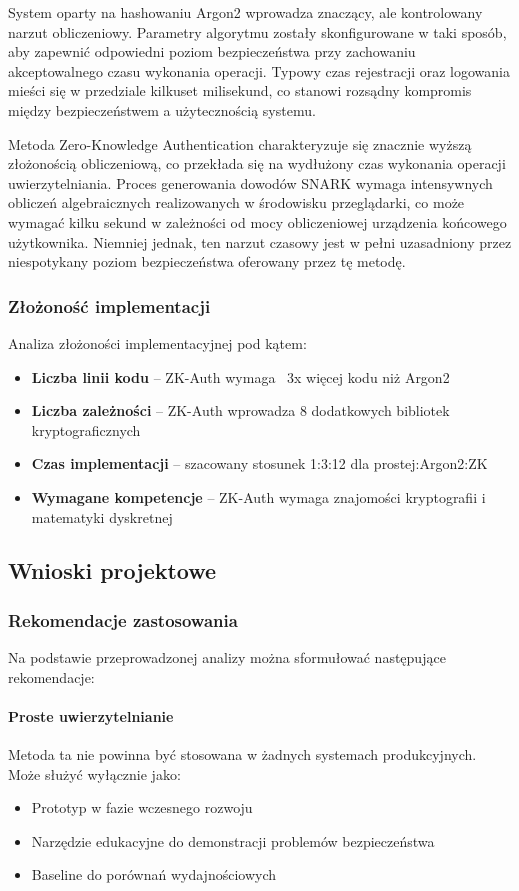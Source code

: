 \documentclass{article}
\begin{document}
System oparty na hashowaniu Argon2 wprowadza znaczący, ale kontrolowany narzut obliczeniowy. Parametry algorytmu zostały skonfigurowane w taki sposób, aby zapewnić odpowiedni poziom bezpieczeństwa przy zachowaniu akceptowalnego czasu wykonania operacji. Typowy czas rejestracji oraz logowania mieści się w przedziale kilkuset milisekund, co stanowi rozsądny kompromis między bezpieczeństwem a użytecznością systemu.

Metoda Zero-Knowledge Authentication charakteryzuje się znacznie wyższą złożonością obliczeniową, co przekłada się na wydłużony czas wykonania operacji uwierzytelniania. Proces generowania dowodów SNARK wymaga intensywnych obliczeń algebraicznych realizowanych w środowisku przeglądarki, co może wymagać kilku sekund w zależności od mocy obliczeniowej urządzenia końcowego użytkownika. Niemniej jednak, ten narzut czasowy jest w pełni uzasadniony przez niespotykany poziom bezpieczeństwa oferowany przez tę metodę.

\subsubsection{Złożoność implementacji}
Analiza złożoności implementacyjnej pod kątem:
\begin{itemize}
    \item \textbf{Liczba linii kodu} – ZK-Auth wymaga ~3x więcej kodu niż Argon2
    \item \textbf{Liczba zależności} – ZK-Auth wprowadza 8 dodatkowych bibliotek kryptograficznych
    \item \textbf{Czas implementacji} – szacowany stosunek 1:3:12 dla prostej:Argon2:ZK
    \item \textbf{Wymagane kompetencje} – ZK-Auth wymaga znajomości kryptografii i matematyki dyskretnej
\end{itemize}

\subsection{Wnioski projektowe}

\subsubsection{Rekomendacje zastosowania}
Na podstawie przeprowadzonej analizy można sformułować następujące rekomendacje:

\paragraph{Proste uwierzytelnianie}
Metoda ta nie powinna być stosowana w żadnych systemach produkcyjnych. Może służyć wyłącznie jako:
\begin{itemize}
    \item Prototyp w fazie wczesnego rozwoju
    \item Narzędzie edukacyjne do demonstracji problemów bezpieczeństwa
    \item Baseline do porównań wydajnościowych
\end{itemize}
\end{document}
